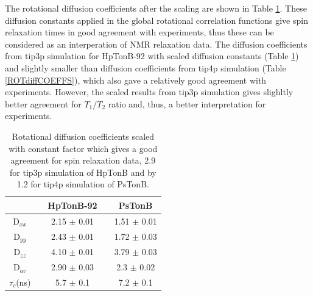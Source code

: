 \documentclass[pre,aps,floatfix,authordate1-4,twocolumn]{revtex4-1}
\begin{document}
The rotational diffusion coefficients after the scaling are shown in Table \ref{ROTdiffCOEFFSscaled}.
These diffusion constants applied in the global rotational correlation functions give
spin relaxation times in good agreement with experiments, thus these can be considered
as an interperation of NMR relaxation data. The diffusion coefficients from tip3p simulation for HpTonB-92
with scaled diffusion constants (Table \ref{ROTdiffCOEFFSscaled}) and slightly smaller
than diffusion coefficients from tip4p simulation (Table \ref{ROTdiffCOEFFS}), which also
gave a relatively good agreement with experiments. However, the scaled results from
tip3p simulation gives slighltly better agreement for $T_1/T_2$ ratio and, thus, a
better interpretation for experiments.
\begin{table}[!h]
  \centering
  \caption{Rotational diffusion coefficients scaled with constant factor which
    gives a good agreement for spin relaxation data,  2.9 for tip3p simulation of HpTonB
    and by 1.2 for tip4p simulation of PsTonB.}\label{ROTdiffCOEFFSscaled}
  \begin{tabular}{c c c c c}
    &    &  HpTonB-92  &  & PsTonB \\
    \hline
    D$_{xx}$    &   &   2.15 $\pm$ 0.01  & & 1.51  $\pm$ 0.01\\
    D$_{yy}$   &    &  2.43  $\pm$ 0.01  & & 1.72  $\pm$ 0.03\\
    D$_{zz}$   &    &  4.10   $\pm$ 0.01 & & 3.79  $\pm$ 0.03\\
    D$_{av}$  &    &   2.90  $\pm$ 0.03  & & 2.3  $\pm$ 0.02\\
    $\tau_{c}$(ns)  &    &  5.7   $\pm$ 0.1  & & 7.2 $\pm$ 0.1 \\
\end{tabular}
\end{table} 


  
\end{document}
